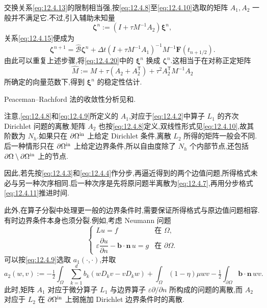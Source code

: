 交换关系\eqref{eq:12.4.13}的限制相当强,按\eqref{eq:12.4.8}至\eqref{eq:12.4.10}选取的矩阵 \(A_1,A_2\) 一般并不满足它.不过,引入辅助未知量
\begin{equation}\label{eq:12.4.21}
  \boldsymbol{\zeta}^n:=(I+\tau M^{-1}A_2)\boldsymbol{\xi}^n,
\end{equation}
关系\eqref{eq:12.4.15}便成为
\begin{equation}\label{eq:12.4.22}
  \boldsymbol{\zeta}^{n+1}=\widehat{\mathcal B}\boldsymbol{\zeta}^n
    +\Delta t(I+\tau M^{-1}A_1)^{-1}M^{-1}\boldsymbol{F}(t_{n+1/2}).
\end{equation}
由此可以重复上述步骤,将\eqref{eq:12.4.20}中的 \(\boldsymbol{\xi}^n\) 换成 \(\boldsymbol{\zeta}^n\).这相当于在对称正定矩阵
\[
  \widehat M:=M+\tau(A_2+A_2^{\mathsf T})
    +\tau^2A_2^{\mathsf T}M^{-1}A_2
\]
所确定的向量范数下,得到 \(\boldsymbol{\xi}^n\) 的稳定性估计.

Peaceman--Rachford 法的收敛性分析见和.

注意,\eqref{eq:12.4.8}和\eqref{eq:12.4.9}所定义的 \(A_1\),对应于\eqref{eq:12.4.2}中算子 \(L_1\) 的齐次 Dirichlet 问题的离散.矩阵 \(A_2\) 也按\eqref{eq:12.4.8}定义,双线性形式见\eqref{eq:12.4.10},故其阶数为 \(N_h\).如果只在 \(\partial\Omega^{\rm in}\) 上给定 Dirichlet 条件,离散 \(L_2\) 所得的矩阵一般会不同.后一种情形只在 \(\partial\Omega^{\rm in}\) 上给定边界条件,所以自由度除了 \(N_h\) 个内部节点,还包括 \(\partial\Omega\setminus\partial\Omega^{\rm in}\) 上的节点.

因此,若先按\eqref{eq:12.4.3}和\eqref{eq:12.4.4}作分步,再逼近得到的两个边值问题,所得格式未必与另一种次序相同.后一种次序是先将原问题半离散为\eqref{eq:12.4.7},再用分步格式\eqref{eq:12.4.11}推进时间.

此外,在算子分裂中处理更一般的边界条件时,需要保证所得格式与原边值问题相容.有时边界条件本身也须分裂.例如,考虑 Neumann 问题
\[
  \begin{cases}
    Lu=f & \text{在 }\Omega,\\[2pt]
    \varepsilon\dfrac{\partial u}{\partial n}-\boldsymbol{b}\cdot\boldsymbol{n}\,u=g
      & \text{在 }\partial\Omega.
  \end{cases}
\]
可以按\eqref{eq:12.4.9}选取 \(a_1(\cdot,\cdot)\),并取
\[
  a_2(w,v):=-\tfrac12\int_\Omega\sum_{k=1}^d b_k(wD_kv-vD_kw)
    +\int_\Omega(1-\eta)\mu wv
    -\tfrac12\int_{\partial\Omega}\boldsymbol{b}\cdot\boldsymbol{n}\,wv.
\]
此时,矩阵 \(A_1\) 对应于微分算子 \(L_1\) 与边界算子 \(\varepsilon\partial/\partial n\) 所构成的问题的离散,而 \(A_2\) 对应于 \(L_2\) 在 \(\partial\Omega^{\rm in}\) 上弱施加 Dirichlet 边界条件时的离散.

